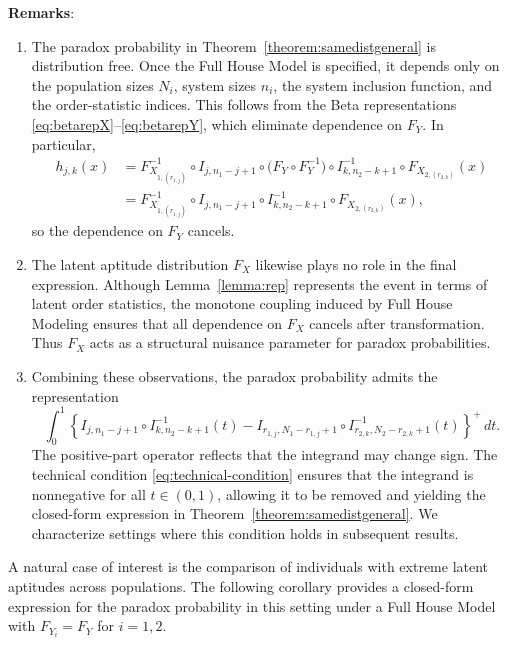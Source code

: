 \documentclass[12pt]{article}
\begin{document}
\noindent \textbf{Remarks}:
\begin{enumerate}
\item The paradox probability in Theorem~\ref{theorem:samedistgeneral} is distribution free. Once the Full House Model is specified, it depends only on the population sizes $N_i$, system sizes $n_i$, the system inclusion function, and the order-statistic indices. This follows from the Beta representations \eqref{eq:betarepX}--\eqref{eq:betarepY}, which eliminate dependence on $F_Y$. In particular,
\begin{align*}
	h_{j,k}(x)
	&= F_{X_{1,(r_{1,j})}}^{-1} \circ I_{j,n_1-j+1} \circ \big(F_Y \circ F_Y^{-1}\big) \circ I^{-1}_{k,n_2-k+1} \circ F_{X_{2,(r_{2,k})}} (x) \\
	&= F_{X_{1,(r_{1,j})}}^{-1} \circ I_{j,n_1-j+1} \circ I^{-1}_{k,n_2-k+1} \circ F_{X_{2,(r_{2,k})}} (x),
\end{align*}
so the dependence on $F_Y$ cancels.

	\item The latent aptitude distribution $F_X$ likewise plays no role in the final expression. Although Lemma~\ref{lemma:rep} represents the event in terms of latent order statistics, the monotone coupling induced by Full House Modeling ensures that all dependence on $F_X$ cancels after transformation. Thus $F_X$ acts as a structural nuisance parameter for paradox probabilities.

	\item Combining these observations, the paradox probability admits the representation
	\[
	  \int_0^1\left\{
		I_{j, n_1-j+1} \circ I_{k, n_2-k+1}^{-1}(t)
		-
		I_{r_{1,j}, N_1-r_{1,j}+1} \circ I_{r_{2,k}, N_2-r_{2,k}+1}^{-1}(t)
	  \right\}^{+}\, dt.
	\]
	The positive-part operator reflects that the integrand may change sign. The technical condition \eqref{eq:technical-condition} ensures that the integrand is nonnegative for all $t \in (0,1)$, allowing it to be removed and yielding the closed-form expression in Theorem~\ref{theorem:samedistgeneral}. We characterize settings where this condition holds in subsequent results.
\end{enumerate}


A natural case of interest is the comparison of individuals with extreme latent aptitudes across populations. The following corollary provides a closed-form expression for the paradox probability in this setting under a Full House Model with $F_{Y_i} = F_Y$ for $i=1,2$.
\end{document}

